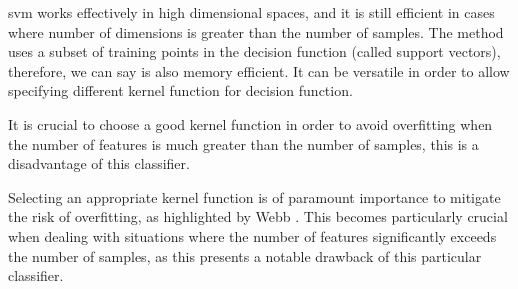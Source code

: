 \gls{svm} works effectively in high dimensional spaces, and it is still efficient in cases where number of dimensions is greater than the number of samples. The method uses a subset of training points in the decision function (called support vectors), therefore, we can say is also memory efficient. It can be versatile in order to allow specifying different kernel function for decision function.  \cite{scikit_learn2023}

It is crucial to choose a good kernel function in order to avoid overfitting  when the number of features is much greater than the number of samples, this is a disadvantage of this classifier.

Selecting an appropriate kernel function is of paramount importance to mitigate the risk of overfitting, as highlighted by Webb \cite{OverfittingWebb}. This becomes particularly crucial when dealing with situations where the number of features significantly exceeds the number of samples, as this presents a notable drawback of this particular classifier.


